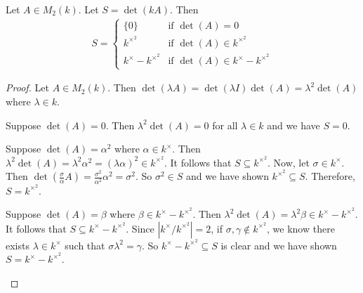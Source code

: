\documentclass{amsart}
\begin{document}
\begin{lemma}
    Let $A \in M_2(k)$. Let $S = \det(kA)$. Then 
    \begin{align*}
        S =
        \begin{cases}
            \{0\}                     &\text{if } \det(A) = 0 \\
            k^{\times^2}              &\text{if } \det(A) \in k^{\times^2} \\
            k^{\times} - k^{\times^2} &\text{if } \det(A) \in k^{\times} - k^{\times^2}
        \end{cases}
    \end{align*}
\end{lemma}
\begin{proof}
    Let $A \in M_2(k)$. Then $\det(\lambda A) = \det(\lambda I)\det(A) = \lambda^2\det(A)$ where $\lambda \in k$. 
    \begin{Case}
        \item Suppose $\det(A) = 0$. Then $\lambda^2\det(A) = 0$ for all $\lambda \in k$ and we have $S = 0$.
        \item Suppose $\det(A) = \alpha^2$ where $\alpha \in k^{\times}$. Then $\lambda^2\det(A) = \lambda^2\alpha^2 = (\lambda\alpha)^2 \in k^{\times^2}$. It follows that $S \subseteq k^{\times^2}$. Now, let $\sigma \in k^{\times}$. Then $\det(\frac{\sigma}{\alpha}A) = \frac{\sigma^2}{\alpha^2}\alpha^2 = \sigma^2$. So $\sigma^2 \in S$ and we have shown $k^{\times^2} \subseteq S$. Therefore, $S = k^{\times^2}$.
        \item Suppose $\det(A) = \beta$ where $\beta \in k^{\times} - k^{\times^2}$. Then $\lambda^2\det(A) = \lambda^2\beta \in k^{\times} - k^{\times^2}$. It follows that $S \subseteq k^{\times} - k^{\times^2}$. Since $|k^{\times}/k^{\times^2}| = 2$, if $\sigma, \gamma \notin k^{\times^2}$, we know there exists $\lambda \in k^{\times}$ such that $\sigma\lambda^2 = \gamma$. So $k^{\times} - k^{\times^2} \subseteq S$ is clear and we have shown $S = k^{\times} - k^{\times^2}$.
    \end{Case}
\end{proof}
\end{document}
